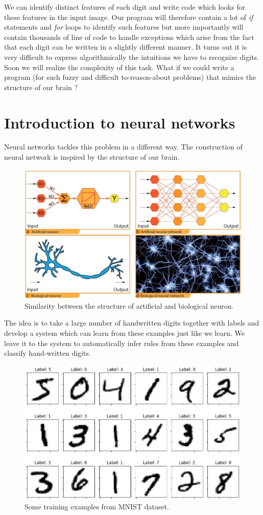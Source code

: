 We can identify distinct features of each digit and write code which looks for these features in the input image. 
Our program will therefore contain a lot of \emph{if} statements and \emph{for} loops to identify such features 
but more importantly will contain thousands of line of code to handle exceptions which arise from the fact that 
each digit can be written in a slightly different manner. It turns out it is very difficult to express algorithmically 
the intuitions we have to recognize digits. Soon we will realize the complexity of this task. What if we could write a 
program (for such fuzzy and difficult to-reason-about problems) that mimics the structure of our brain ?  
\section{Introduction to neural networks}
Neural networks tackles this problem in a different way. The construction of neural network
is inspired by the structure of our brain. 
\begin{figure}[htbp]
    \centering
    \includegraphics[width=.5\textwidth]{Figures/artificial_vs_normal_neurons.png}
    \caption{Similarity between the structure of artificial and biological neuron.}
    \label{fig:bio_neu}
\end{figure} 
The idea is to take a large number of handwritten digits together with labels and develop a system 
which can learn from these examples just like we learn. We leave it to the system to automatically infer rules 
from these examples and classify hand-written digits. 
\begin{figure}[htbp]
    \centering
    \includegraphics[width=.5\textwidth]{Figures/training_examples_mnist.png}
    \caption{Some training examples from MNIST dataset.}
    \label{fig:train_MNIST}
\end{figure} 

